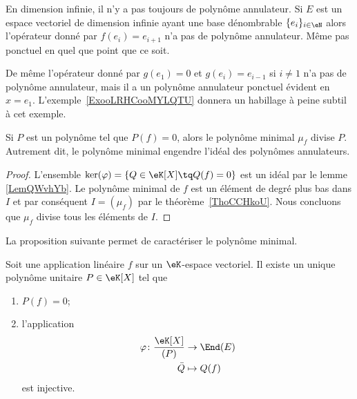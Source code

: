 \begin{example}       \label{ExooDTUJooIMqSKn}
	En dimension infinie, il n'y a pas toujours de polynôme annulateur. Si \( E\) est un espace vectoriel de dimension infinie ayant une base dénombrable \( \{ e_i \}_{i\in \eN}\) alors l'opérateur donné par \( f(e_i)=e_{i+1}\) n'a pas de polynôme annulateur. Même pas ponctuel en quel que point que ce soit.

	De même l'opérateur donné par \( g(e_1)=0\) et \( g(e_i)=e_{i-1}\) si \( i\neq 1\) n'a pas de polynôme annulateur, mais il a un polynôme annulateur ponctuel évident en \( x=e_1\). L'exemple~\ref{ExooLRHCooMYLQTU} donnera un habillage à peine subtil à cet exemple.
\end{example}

\begin{proposition}     \label{PropAnnncEcCxj}
	Si \( P\) est un polynôme tel que \( P(f)=0\), alors le polynôme minimal \( \mu_f\) divise \( P\). Autrement dit, le polynôme minimal engendre l'idéal des polynômes annulateurs.
\end{proposition}

\begin{proof}
	L'ensemble \( \ker(\varphi)=\{ Q\in \eK[X]\tq Q(f)=0 \} \) est un idéal par le lemme \ref{LemQWvhYb}. Le polynôme minimal de \( f\) est un élément de degré plus bas dans \( I\) et par conséquent \( I=(\mu_f)\) par le théorème~\ref{ThoCCHkoU}. Nous concluons que \( \mu_f\) divise tous les éléments de \( I\).
\end{proof}

La proposition suivante permet de caractériser le polynôme minimal.
\begin{proposition}      \label{PROPooVUJPooMzxzjE}
	Soit une application linéaire \( f\) sur un \( \eK\)-espace vectoriel. Il existe un unique polynôme unitaire \( P\in \eK[X]\) tel que
	\begin{enumerate}
		\item
		      \( P(f)=0\);
		\item
		      l'application
		      \begin{equation}        \label{EQooIBMDooVTaEhf}
			      \begin{aligned}
				      \varphi\colon \frac{ \eK[X] }{ (P) } & \to \End(E)  \\
				      \bar Q                               & \mapsto Q(f)
			      \end{aligned}
		      \end{equation}
		      est injective.
	\end{enumerate}
\end{proposition}

